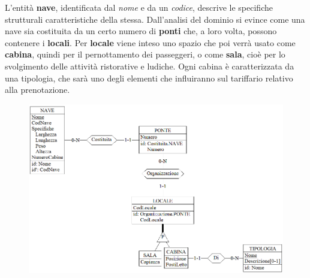 \documentclass[a4paper, titlepage]{report}
\begin{document}
	\noindent
	L'entità \textbf{nave}, identificata dal \textit{nome} e da un  \textit{codice}, descrive le specifiche strutturali caratteristiche della stessa. Dall'analisi del dominio si evince come una nave sia costituita da un certo numero di \textbf{ponti} che, a loro volta, possono contenere i \textbf{locali}. Per \textbf{locale} viene inteso uno spazio che poi verrà usato come \textbf{cabina}, quindi per il pernottamento dei passeggeri, o come \textbf{sala}, cioè per lo svolgimento delle attività ristorative e ludiche. Ogni cabina è caratterizzata da una tipologia, che sarà uno degli elementi che influiranno sul tariffario relativo alla prenotazione. \\
    \vspace{0.4cm}
    \begin{figure}[h]
		\centering
		\includegraphics[scale=0.7]{images/Navi.png}		
	\end{figure}	
	\vspace{0.4cm}
\end{document}
